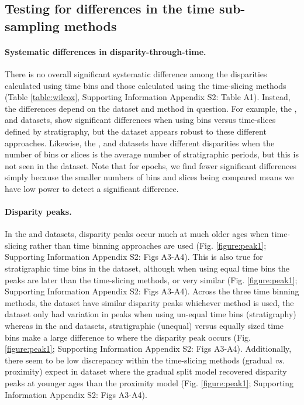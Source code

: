 \documentclass[12pt,a4paper]{article}
\begin{document}
\subsection{Testing for differences in the time sub-sampling methods}

\paragraph{Systematic differences in disparity-through-time.} 
There is no overall significant systematic difference among the disparities calculated using time bins and those calculated using the time-slicing methods (Table \ref{table:wilcox}, Supporting Information Appendix S2: Table A1).
Instead, the differences depend on the dataset and method in question.
For example, the \cite{brusatte2014gradual}, \cite{bapst2016topology} and \cite{wright2017bayesian} datasets, show significant differences when using bins versus time-slices defined by stratigraphy, but the \cite{beckancient2014} dataset appears robust to these different approaches.
Likewise, the \cite{beckancient2014}, \cite{brusatte2014gradual} and \cite{bapst2016topology} datasets have different disparities when the number of bins or slices is the average number of stratigraphic periods, but this is not seen in the \cite{wright2017bayesian} dataset.
Note that for epochs, we find fewer significant differences simply because the smaller numbers of bins and slices being compared means we have low power to detect a significant difference.

%  

\paragraph{Disparity peaks.}
In the \cite{beckancient2014} and \cite{bapst2016topology} datasets, disparity peaks occur much at much older ages when time-slicing rather than time binning approaches are used (Fig. \ref{figure:peak1}; Supporting Information Appendix S2: Figs A3-A4).
This is also true for stratigraphic time bins in the \cite{wright2017bayesian} dataset, although when using equal time bins the peaks are later than the time-slicing methods, or very similar (Fig. \ref{figure:peak1}; Supporting Information Appendix S2: Figs A3-A4).
Across the three time binning methods, the \cite{brusatte2014gradual} dataset have similar disparity peaks whichever method is used, the \cite{wright2017bayesian} dataset only had variation in peaks when using un-equal time bins (stratigraphy) whereas in the \cite{bapst2016topology} and \cite{beckancient2014} datasets, stratigraphic (unequal) versus equally sized time bins make a large difference to where the disparity peak occurs (Fig. \ref{figure:peak1}; Supporting Information Appendix S2: Figs A3-A4).
Additionally, there seem to be low discrepancy within the time-slicing methods (gradual \textit{vs.} proximity) expect in \cite{beckancient2014} dataset where the gradual split model recovered disparity peaks at younger ages than the proximity model (Fig. \ref{figure:peak1}; Supporting Information Appendix S2: Figs A3-A4).
\end{document}
